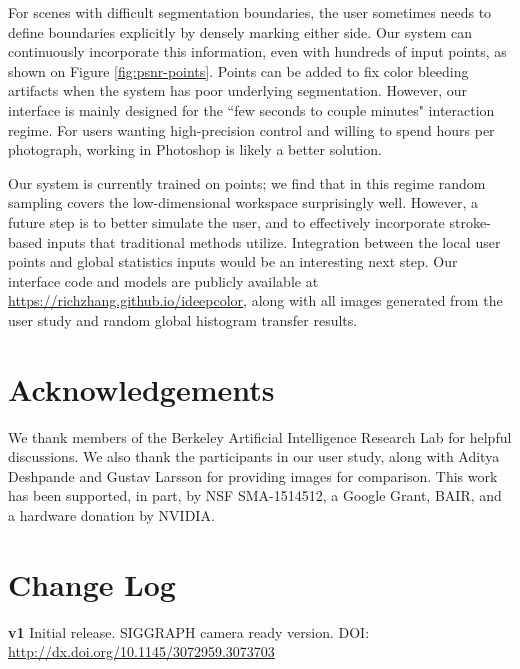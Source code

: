 \documentclass[acmtog,authorversion]{acmart}
\begin{document}
For scenes with difficult segmentation boundaries, the user sometimes needs to define boundaries explicitly by densely marking either side. Our system can continuously incorporate this information, even with hundreds of input points, as shown on Figure \ref{fig:psnr-points}. Points can be added to fix color bleeding artifacts when the system has poor underlying segmentation. However, our interface is mainly designed for the ``few seconds to couple minutes" interaction regime. For users wanting high-precision control and willing to spend hours per photograph, working in Photoshop is likely a better solution.

Our system is currently trained on points; we find that in this regime random sampling covers the low-dimensional workspace surprisingly well. However, a future step is to better simulate the user, and to effectively incorporate stroke-based inputs that traditional methods utilize. Integration between the local user points and global statistics inputs would be an interesting next step. Our interface code and models are publicly available at \url{https://richzhang.github.io/ideepcolor}, along with all images generated from the user study and random global histogram transfer results. \section*{Acknowledgements}

We thank members of the Berkeley Artificial Intelligence Research Lab for helpful discussions. We also thank the participants in our user study, along with Aditya Deshpande and Gustav Larsson for providing images for comparison. This work has been supported, in part, by NSF SMA-1514512, a Google Grant, BAIR, and a hardware donation by NVIDIA.
%
 \section*{Change Log}

\noindent \textbf{v1} Initial release. SIGGRAPH camera ready version. DOI: \url{http://dx.doi.org/10.1145/3072959.3073703}
%
 

\end{document}
